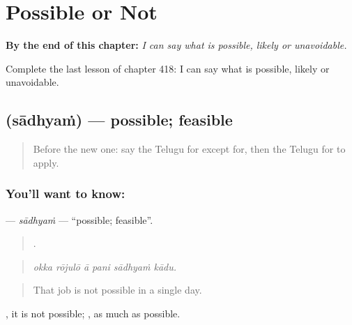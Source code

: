 
\chapter{Possible or Not}
\label{ch:te-possible-or-not}

\begin{chapteropening}
\textbf{By the end of this chapter:} \emph{I can say what is possible, likely or unavoidable.}

Complete the last lesson of chapter 418: I can say what is possible, likely or unavoidable.
\end{chapteropening}

\section[\texorpdfstring{\te{సాధ్యం} (sādhyaṁ)}{సాధ్యం (sādhyaṁ)}]{ (sādhyaṁ) — possible; feasible}

\label{lesson:TE-C418-sadhyam}



\begin{quote}
Before the new one: say the Telugu for except for, then the Telugu for to apply.
\end{quote}

\subsection*{You'll want to know: }
\textbf{} — \emph{sādhyaṁ} — \textquotedblleft{}possible; feasible\textquotedblright{}.

\begin{quote}
     .
\end{quote}

\begin{quote}
\emph{okka rōjulō ā pani sādhyaṁ kādu.}
\end{quote}

\begin{quote}
That job is not possible in a single day.
\end{quote}

 , it is not possible; , as much as possible.

